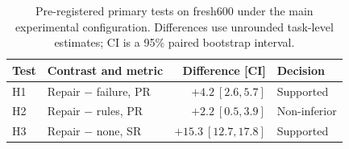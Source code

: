 \begin{table}[tbp]
\caption{Pre-registered primary tests on fresh600 under the main experimental configuration. Differences use unrounded task-level estimates; CI is a 95\% paired bootstrap interval.}
\label{tab:hypotheses}\centering
\begin{tabular}{llrl}\toprule
Test & Contrast and metric & Difference [CI] & Decision\\\midrule
H1 & Repair $-$ failure, PR & $+4.2\ [2.6,5.7]$ & Supported\\
H2 & Repair $-$ rules, PR & $+2.2\ [0.5,3.9]$ & Non-inferior\\
H3 & Repair $-$ none, SR & $+15.3\ [12.7,17.8]$ & Supported\\\bottomrule
\end{tabular}
\end{table}
